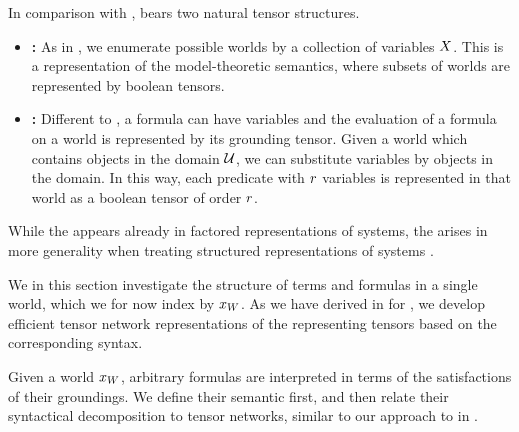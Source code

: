 


In comparison with \propositionalLogic{}, \firstOrderLogic{} bears two natural tensor structures.
\begin{itemize}
    \item \textbf{\SemanticStructure{}:} As in \propositionalLogic{}, we enumerate possible worlds by a collection of variables $X$.
    This is a representation of the model-theoretic semantics, where subsets of worlds are represented by boolean tensors.
    \item \textbf{\SubstitutionStructure{}:}
    Different to \propositionalLogic{}, a formula can have variables and the evaluation of a formula on a world is represented by its grounding tensor.
    Given a world which contains objects in the domain $\mathcal{U}$, we can substitute variables by objects in the domain.
    In this way, each predicate with $r$ variables is represented in that world as a boolean tensor of order $r$.
\end{itemize}
While the \semanticStructure{} appears already in factored representations of systems, the \substitutionStructure{} arises in more generality when treating structured representations of systems \cite{russell_artificial_2021}.



\sect{\SubstitutionStructure{}}

We in this section investigate the structure of terms and formulas in a single \firstOrderLogic{} world, which we for now index by $x_{W}$.
As we have derived in  for \propositionalLogic{}, we develop efficient tensor network representations of the representing tensors based on the corresponding syntax.


Given a \firstOrderLogic{} world $x_{W}$, arbitrary formulas are interpreted in terms of the satisfactions of their groundings.
We define their semantic first, and then relate their syntactical decomposition to tensor networks, similar to our approach to \propositionalLogic{} in .

